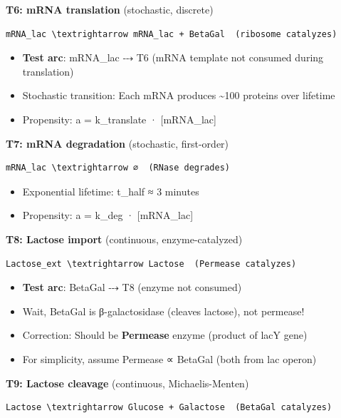 \textbf{T6: mRNA translation} (stochastic, discrete)

\begin{lstlisting}
mRNA_lac \textrightarrow mRNA_lac + BetaGal  (ribosome catalyzes)
\end{lstlisting}

\begin{itemize}
\tightlist
\item
  \textbf{Test arc}: mRNA\_lac ⤏ T6 (mRNA template not consumed during
  translation)
\item
  Stochastic transition: Each mRNA produces \textasciitilde100 proteins
  over lifetime
\item
  Propensity: a = k\_translate · {[}mRNA\_lac{]}
\end{itemize}

\textbf{T7: mRNA degradation} (stochastic, first-order)

\begin{lstlisting}
mRNA_lac \textrightarrow ∅  (RNase degrades)
\end{lstlisting}

\begin{itemize}
\tightlist
\item
  Exponential lifetime: t\_half ≈ 3 minutes
\item
  Propensity: a = k\_deg · {[}mRNA\_lac{]}
\end{itemize}

\textbf{T8: Lactose import} (continuous, enzyme-catalyzed)

\begin{lstlisting}
Lactose_ext \textrightarrow Lactose  (Permease catalyzes)
\end{lstlisting}

\begin{itemize}
\tightlist
\item
  \textbf{Test arc}: BetaGal ⤏ T8 (enzyme not consumed)
\item
  Wait, BetaGal is β-galactosidase (cleaves lactose), not permease!
\item
  Correction: Should be \textbf{Permease} enzyme (product of lacY gene)
\item
  For simplicity, assume Permease ∝ BetaGal (both from lac operon)
\end{itemize}

\textbf{T9: Lactose cleavage} (continuous, Michaelis-Menten)

\begin{lstlisting}
Lactose \textrightarrow Glucose + Galactose  (BetaGal catalyzes)
\end{lstlisting}

